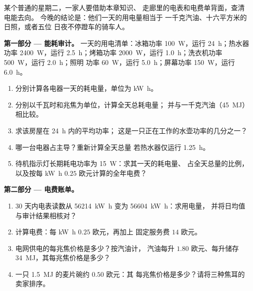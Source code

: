 \begin{problem}
\label{pb:g10:energy-conservation:1}
某个普通的星期二，一家人要借助本章知识、
走廊里的电表和电费单背面，查清电能去向。
今晚的结论是：他们一天的用电量相当于
一千克汽油、十六平方米的日照，或者五位
日夜不停蹬车的骑车人。

\medskip
\noindent\textbf{第一部分 --- 能耗审计。}
一天的用电清单：冰箱功率 \qty{100}{W}，运行 \qty{24}{h}；热水器
功率 \qty{2400}{W}，运行 \qty{2.5}{h}；烤箱功率 \qty{2000}{W}，运行
\qty{1.0}{h}；洗衣机功率 \qty{500}{W}，运行 \qty{2.0}{h}；照明
功率 \qty{60}{W}，运行 \qty{5.0}{h}；屏幕功率 \qty{150}{W}，运行 \qty{6.0}{h}。
\begin{enumerate}
  \item 分别计算各电器一天的耗电量，单位为 \unit{kW.h}。
  \item 分别以千瓦时和兆焦为单位，计算全天总耗电量；
        并与一千克汽油（\qty{45}{MJ}）相比较。
  \item 求该房屋在 \qty{24}{h} 内的平均功率；
        这是一只正在工作的水壶功率的几分之一？
  \item 哪一台电器占主导？重新计算全天总量
        若热水器仅运行 \qty{1.25}{h}。
  \item 待机指示灯长期耗电功率为 \qty{15}{W}：求其一天的耗电量、
        占全天总量的比例，以及按每 \unit{kW.h} $0.25$ 欧元计算的全年电费？
\end{enumerate}

\medskip
\noindent\textbf{第二部分 --- 电费账单。}
\begin{enumerate}[resume]
  \item 30 天内电表读数从 \qty{56214}{kW.h} 变为
        \qty{56604}{kW.h}：求用电量，
        并将日均值与审计结果相核对？
  \item 计算电费：每 \unit{kW.h} $0.25$ 欧元，再加上
        固定服务费 $14$ 欧元。
  \item 电网供电的每兆焦价格是多少？按汽油计，
        汽油每升 $1.80$ 欧元、每升储存 \qty{34}{MJ}，其每兆焦价格是多少？
  \item 一只 \qty{1.5}{MJ} 的麦片碗约 $0.50$ 欧元：其
        每兆焦价格是多少？请将三种焦耳的卖家排序。
\end{enumerate}


\end{problem}
